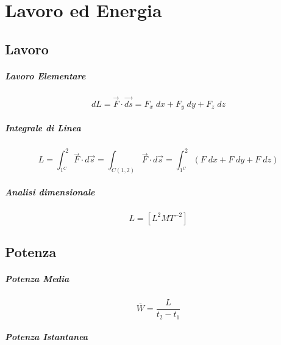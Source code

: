 \chapter{Lavoro ed Energia}

\section{Lavoro}

\paragraph{Lavoro Elementare}

\begin{equation}
  dL = \vec{F} \cdot \vec{ds} = F_x \; dx + F_y \; dy + F_z \; dz
\end{equation}

\paragraph{Integrale di Linea}

\begin{equation}
  L = \int_{1^C}^2 \vec{F} \cdot d\vec{s} =
  \int_{C(1,2)} \vec{F} \cdot d\vec{s} =
  \int_{1^C}^2 \left(F \; dx + F \; dy + F \; dz\right)
\end{equation}

\paragraph{Analisi dimensionale}

\begin{equation}
  L = \left[L^2 M T^{-2}\right]
\end{equation}

\section{Potenza}

\paragraph{Potenza Media}

\begin{equation}
  \overline{W} = \frac{L}{t_2 - t_1}
\end{equation}

\paragraph{Potenza Istantanea}

